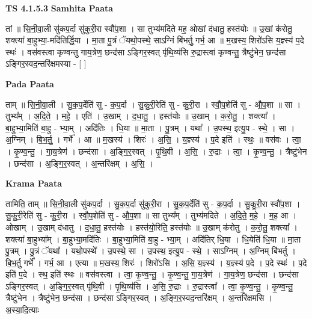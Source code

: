 \documentclass[17pt]{extarticle}
\begin{document}
\textbf{TS 4.1.5.3 } \newline
\textbf{Samhita Paata} \newline

तां ॥ सि॒नी॒वा॒ली सु॑कप॒र्दा सु॑कुरी॒रा स्वौ॑प॒शा । सा तुभ्य॑मदिते मह॒ ओखां द॑धातु॒ हस्त॑योः ॥ उ॒खां क॑रोतु॒ शक्त्या॑ बा॒हुभ्या॒-मदि॑तिर्द्धि॒या । मा॒ता पु॒त्रं ॅयथो॒पस्थे॒ साऽग्निं बि॑भर्तु॒ गर्भ॒ आ ॥ म॒खस्य॒ शिरो॑ऽसि य॒ज्ञ्स्य॑ प॒दे स्थः॑ । वस॑वस्त्वा कृण्वन्तु गाय॒त्रेण॒ छन्द॑सा ऽङ्गिर॒स्वत् पृ॑थि॒व्य॑सि रु॒द्रास्त्वा॑ कृण्वन्तु॒ त्रैष्टु॑भेन॒ छन्द॑सा ऽङ्गिर॒स्वद॒न्तरि॑क्षमस्या - [  ] \newline

\textbf{Pada Paata} \newline

ताम् ॥ सि॒नी॒वा॒ली । सु॒क॒प॒र्देति॑ सु - क॒प॒र्दा । सु॒कु॒री॒रेति॑ सु - कु॒री॒रा । स्वौ॒प॒शेति॑ सु - औ॒प॒शा ॥ सा । तुभ्य᳚म् । अ॒दि॒ते॒ । म॒हे॒ । एति॑ । उ॒खाम् । द॒धा॒तु॒ । हस्त॑योः ॥ उ॒खाम् । क॒रो॒तु॒ । शक्त्या᳚ । बा॒हुभ्या॒मिति॑ बा॒हु - भ्या॒म् । अदि॑तिः । धि॒या ॥ मा॒ता । पु॒त्रम् । यथा᳚ । उ॒पस्थ॒ इत्यु॒प - स्थे॒ । सा । अ॒ग्निम् । बि॒भ॒र्तु॒ । गर्भे᳚ । आ ॥ म॒खस्य॑ । शिरः॑ । अ॒सि॒ । य॒ज्ञ्स्य॑ । प॒दे इति॑ । स्थः॒ ॥ वस॑वः । त्वा॒ । कृ॒ण्व॒न्तु॒ । गा॒य॒त्रेण॑ । छन्द॑सा । अ॒ङ्गि॒र॒स्वत् । पृ॒थि॒वी । अ॒सि॒ । रु॒द्राः । त्वा॒ । कृ॒ण्व॒न्तु॒ । त्रैष्टु॑भेन । छन्द॑सा । अ॒ङ्गि॒र॒स्वत् । अ॒न्तरि॑क्षम् । अ॒सि॒ ।  \newline


\textbf{Krama Paata} \newline

तामिति॒ ताम् ॥ सि॒नी॒वा॒ली सु॑कप॒र्दा । सु॒क॒प॒र्दा सु॑कुरी॒रा । सु॒क॒प॒र्देति॑ सु - क॒प॒र्दा । सु॒कु॒री॒रा स्वौ॑प॒शा । सु॒कु॒री॒रेति॑ सु - कु॒री॒रा । स्वौ॒प॒शेति॑ सु - औ॒प॒शा ॥ सा तुभ्य᳚म् । तुभ्य॑मदिते । अ॒दि॒ते॒ म॒हे॒ । म॒ह॒ आ । ओखाम् । उ॒खाम् द॑धातु । द॒धा॒तु॒ हस्त॑योः । हस्त॑यो॒रिति॒ हस्त॑योः ॥ उ॒खाम् क॑रोतु । क॒रो॒तु॒ शक्त्या᳚ । शक्त्या॑ बा॒हुभ्या᳚म् । बा॒हुभ्या॒मदि॑तिः । बा॒हुभ्या॒मिति॑ बा॒हु - भ्या॒म् । अदि॑तिर् धि॒या । धि॒येति॑ धि॒या ॥ मा॒ता पु॒त्रम् । पु॒त्रं ॅयथा᳚ । यथो॒पस्थे᳚ । उ॒पस्थे॒ सा । उ॒पस्थ॒ इत्यु॒प - स्थे॒ । साऽग्निम् । अ॒ग्निम् बि॑भर्तु । बि॒भ॒र्तु॒ गर्भे᳚ । गर्भ॒ आ । एत्या ॥ म॒खस्य॒ शिरः॑ । शिरो॑ऽसि । अ॒सि॒ य॒ज्ञ्स्य॑ । य॒ज्ञ्स्य॑ प॒दे । प॒दे स्थः॑ । प॒दे इति॑ प॒दे । स्थ॒ इति॑ स्थः ॥ वस॑वस्त्वा । त्वा॒ कृ॒ण्व॒न्तु॒ । कृ॒ण्व॒न्तु॒ गा॒य॒त्रेण॑ । गा॒य॒त्रेण॒ छन्द॑सा । छन्द॑सा ऽङ्गिर॒स्वत् । अ॒ङ्गि॒र॒स्वत् पृ॑थि॒वी । पृ॒थि॒व्य॑सि । अ॒सि॒ रु॒द्राः । रु॒द्रास्त्वा᳚ । त्वा॒ कृ॒ण्व॒न्तु॒ । कृ॒ण्व॒न्तु॒ त्रैष्टु॑भेन । त्रैष्टु॑भेन॒ छन्द॑सा । छन्द॑सा ऽङ्गिर॒स्वत् । अ॒ङ्गि॒र॒स्वद॒न्तरि॑क्षम् । अ॒न्तरि॑क्षमसि । अ॒स्या॒दि॒त्याः \newline
\end{document}
